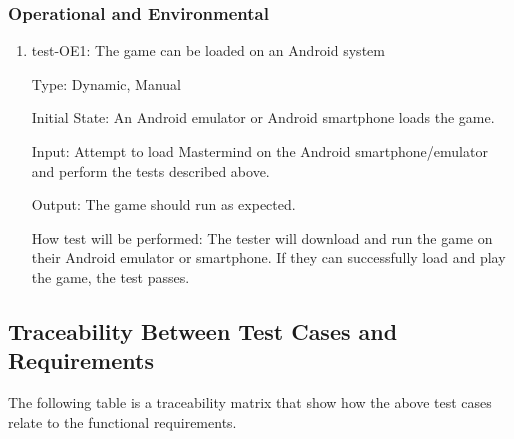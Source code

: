 \documentclass[12pt, titlepage]{article}
\begin{document}
\subsubsection{Operational and Environmental}

\begin{enumerate}

\item{test-OE1: The game can be loaded on an Android system \\}

Type: Dynamic, Manual
					
Initial State: An Android emulator or Android smartphone loads the game.
			
Input: Attempt to load Mastermind on the Android smartphone/emulator and perform the tests described above.
					
Output: The game should run as expected. 
					
How test will be performed: The tester will download and run the game on their Android emulator or smartphone. If they can successfully load and play the game, the test passes.


\end{enumerate}


\subsection{Traceability Between Test Cases and Requirements}

The following table is a traceability matrix that show how the above test cases relate to the functional requirements.\\
\end{document}
